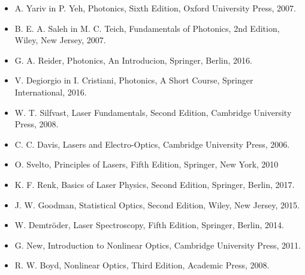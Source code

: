 \documentclass[11pt,fleqn]{book} %
\begin{document}
\begin{itemize}
\setlength\itemsep{0.5em}
 \item A. Yariv in P. Yeh, Photonics, Sixth Edition, Oxford University Press, 2007.
 \item B. E. A. Saleh in M. C. Teich, Fundamentals of Photonics, 2nd Edition, Wiley, New Jersey, 2007. 
 \item G. A. Reider, Photonics, An Introducion, Springer, Berlin, 2016.
\item V. Degiorgio in I. Cristiani, Photonics, A Short Course, Springer International, 2016.
 \item W. T. Silfvast, Laser Fundamentals, Second Edition, Cambridge University Press, 2008. 
 \item C. C. Davis, Lasers and Electro-Optics, Cambridge University Press, 2006.
 \item O. Svelto, Principles of Lasers, Fifth Edition, Springer, New York, 2010
 \item K. F. Renk, Basics of Laser Physics, Second Edition, Springer, Berlin, 2017.
 \item J. W. Goodman, Statistical Optics, Second Edition, Wiley, New Jersey, 2015.
 \item W. Demtr\"oder, Laser Spectroscopy, Fifth Edition, Springer, Berlin, 2014.
 \item G. New, Introduction to Nonlinear Optics, Cambridge University Press, 2011.
 \item R. W. Boyd, Nonlinear Optics, Third Edition, Academic Press, 2008.
\end{itemize}










\end{document}
